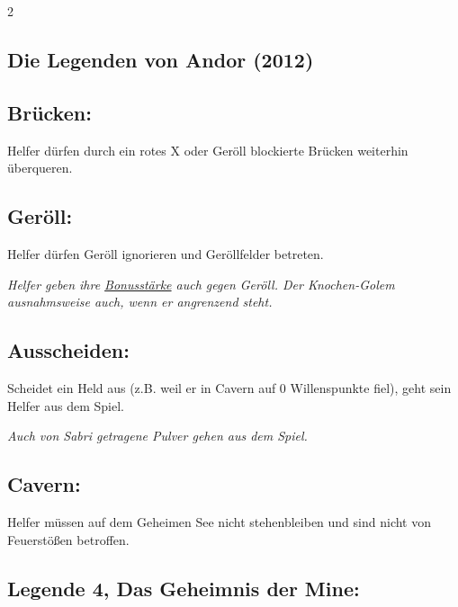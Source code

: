 \documentclass[10pt, a4paper, oneside]{book}
\newcommand{\fan}[1]{\textit{#1}}
\begin{document}
\begin{multicols*}{2}
\begin{nobgcolor}
\end{nobgcolor}









\begin{bgcolor}
\section{Die Legenden von Andor (2012)}

\subsection{Brücken:}

Helfer dürfen durch ein rotes X oder Geröll blockierte Brücken weiterhin überqueren.
\supercite{15332,AG:Begleitheft,MH:Begleitheft}


\subsection{Geröll:}

Helfer dürfen Geröll ignorieren und Geröllfelder betreten.
\supercite{6937,97438,AG:Begleitheft,MH:Begleitheft}

\fan{Helfer geben ihre \hyperref[Bonusstärke]{Bonusstärke} auch gegen Geröll. Der Knochen-Golem ausnahmsweise auch, wenn er angrenzend steht.}



\subsection{Ausscheiden:}

Scheidet ein Held aus (z.B. weil er in Cavern auf 0 Willenspunkte fiel), geht sein Helfer aus dem Spiel.
\supercite{35653}

\fan{Auch von Sabri getragene Pulver gehen aus dem Spiel.}


\subsection{Cavern:}

Helfer müssen auf dem Geheimen See nicht stehenbleiben\supercite{NH:Begleitheft} und sind nicht von Feuerstößen betroffen.



\subsection{Legende 4, Das Geheimnis der Mine:}


\end{bgcolor}
\end{multicols*}
\end{document}
